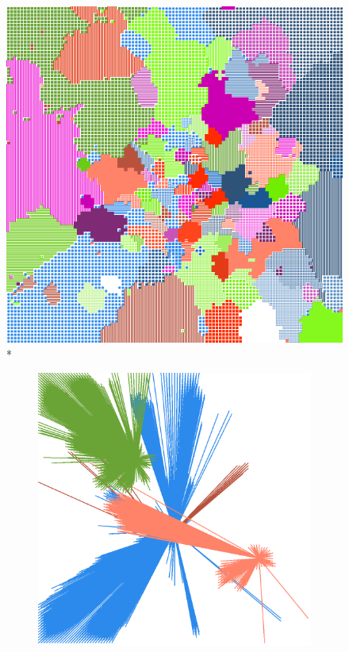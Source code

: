 \documentclass[12pt,a4paper]{article}
\begin{document}
\begin{figure}[H]
\centering
\includegraphics[width=0.8\linewidth]{weekDef/5Fri.png}
\\*
\begin{subfigure}[b]{0.3\textwidth}
\includegraphics[width=\textwidth]{weekDef/edges-5Fri-big.png}
\end{subfigure}
\begin{subfigure}[b]{0.3\textwidth}

\end{subfigure}
\end{figure}
\end{document}
